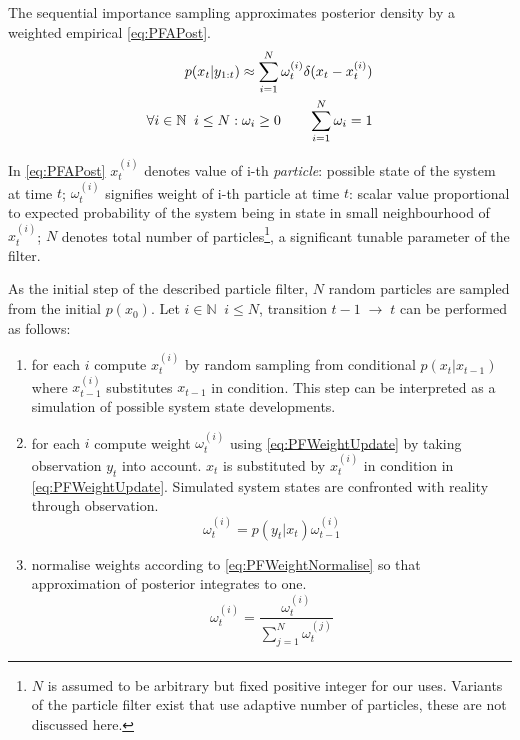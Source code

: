 The sequential importance sampling approximates posterior density by a weighted empirical
{\pdf} \eqref{eq:PFAPost}.
\begin{align}
	p(x_t | y_{1:t}) \approx \sum_{i=1}^N \omega_t^{(i)} \delta(x_t - x_t^{(i)}) \label{eq:PFAPost} \\
	\forall i \in \mathbb{N} \;\; i \leq N: \omega_i \geq 0 \quad\quad \sum_{i=1}^N \omega_i = 1 \notag
\end{align}

In \eqref{eq:PFAPost} \(x_t^{(i)}\) denotes value of i-th \emph{particle}: possible state of the
system at time \(t\);
\(\omega_t^{(i)}\) signifies weight of i-th particle at time \(t\): scalar value proportional to
expected probability of the system being in state in small neighbourhood of \(x_t^{(i)}\);
\(N\) denotes total number of particles\footnote{\(N\) is assumed to be
arbitrary but fixed positive integer for our uses. Variants of the particle filter exist that use
adaptive number of particles, these are not discussed here.}, a significant tunable parameter
of the filter.

As the initial step of the described particle filter, \(N\) random particles are sampled
from the initial {\pdf}
\(p(x_0)\). Let \(i \in \mathbb{N} \;\; i \leq N\), transition \(t-1 \; \rightarrow \; t\) can be
performed as follows:
\begin{enumerate}
	\item for each \(i\) compute \(x_t^{(i)}\) by random sampling from conditional {\pdf}
		\(p(x_t|x_{t-1})\) where \(x_{t-1}^{(i)}\) substitutes \(x_{t-1}\) in condition. This step
		can be interpreted as a simulation of possible system state developments.
	\item for each \(i\) compute weight \(\omega_t^{(i)}\) using \eqref{eq:PFWeightUpdate}
		by taking observation \(y_t\) into account. \(x_t\) is substituted by \(x_t^{(i)}\) in
		condition in \eqref{eq:PFWeightUpdate}. Simulated system states are confronted with reality
		through observation.
		\begin{equation} \label{eq:PFWeightUpdate}
			\omega_t^{(i)} = p(y_t | x_t) \omega_{t-1}^{(i)}
		\end{equation}
	\item normalise weights according to \eqref{eq:PFWeightNormalise} so that approximation of
		posterior {\pdf} integrates to one.
		\begin{equation} \label{eq:PFWeightNormalise}
			\omega_t^{(i)} = \frac{\omega_t^{(i)}}{\sum_{j=1}^N \omega_t^{(j)}}
		\end{equation}
\end{enumerate}

